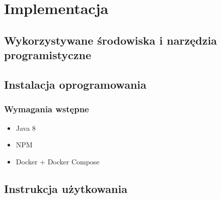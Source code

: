 \chapter{Implementacja}
\section{Wykorzystywane środowiska i narzędzia programistyczne}
\section{Instalacja oprogramowania}
\subsection{Wymagania wstępne}
\begin{itemize}
    \item Java 8
    \item NPM
    \item Docker + Docker Compose
\end{itemize}
\section{Instrukcja użytkowania}

\thispagestyle{normal}
